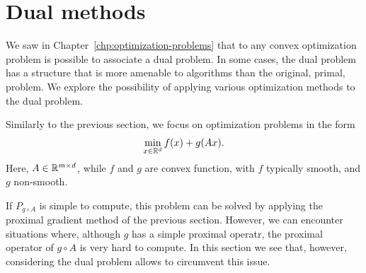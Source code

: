  
 
 
     \section{Dual methods}
 
     We saw in Chapter~\ref{chp:optimization-problems} that to any convex optimization problem is possible to associate a dual problem.
     In some cases, the dual problem has a structure that is more amenable to algorithms than the original, primal, problem. We explore the possibility of applying various optimization methods to the dual problem.
 
     Similarly to the previous section, we focus on optimization problems in the form
     \begin{equation}
         \label{eq:f+gA-dual}
         \min_{x\in\mathbb{R}^d} f(x) + g(Ax).
     \end{equation}
     Here,  $A\in \mathbb{R}^{m\times d}$, while $f$ and $g$ are convex function, with $f$ typically smooth, and $g$ non-smooth.
 
     If $P_{g\circ A}$ is simple to compute, this problem can be solved by applying the proximal gradient method of the previous section.
     However, we can encounter situations where, although $g$ has a simple proximal operatr, the proximal operator of ${g\circ A}$ is very hard to compute.
     In this section we see that, however, considering the dual problem allows to circumvent this issue.
 
